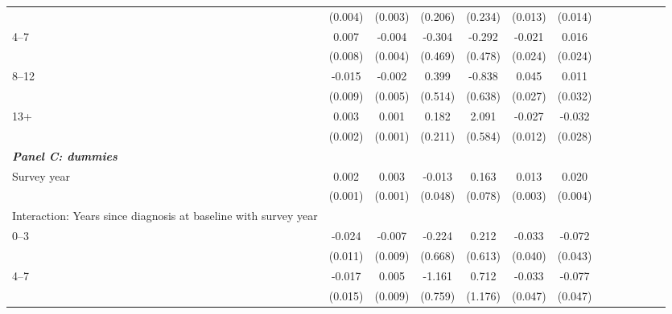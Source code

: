 \documentclass[12pt,english]{article}
\begin{document}
\begin{table}[p]
\begin{center}
\begin{adjustbox}{max width=.9\linewidth}
\begin{threeparttable}
{\begin{tabular}{l*{6}{S S}}
						&  (0.004)         &  (0.003)         &  (0.206)         &  (0.234)         &  (0.013)         &  (0.014)         \\
						\hspace*{10mm}4--7 &    0.007         &   -0.004         &   -0.304         &   -0.292         &   -0.021         &    0.016         \\
						&  (0.008)         &  (0.004)         &  (0.469)         &  (0.478)         &  (0.024)         &  (0.024)         \\
						\hspace*{10mm}8--12 &   -0.015\sym{*}  &   -0.002         &    0.399         &   -0.838         &    0.045\sym{*}  &    0.011         \\
						&  (0.009)         &  (0.005)         &  (0.514)         &  (0.638)         &  (0.027)         &  (0.032)         \\
						\hspace*{10mm}13+ &    0.003         &    0.001         &    0.182         &    2.091\sym{***}&   -0.027\sym{**} &   -0.032         \\
						&  (0.002)         &  (0.001)         &  (0.211)         &  (0.584)         &  (0.012)         &  (0.028)         \\
						\textit{\textbf{Panel C: dummies}} &&&&&&\\
						Survey year     &    0.002\sym{***}&    0.003\sym{***}&   -0.013         &    0.163\sym{**} &    0.013\sym{***}&    0.020\sym{***}\\
						&  (0.001)         &  (0.001)         &  (0.048)         &  (0.078)         &  (0.003)         &  (0.004)         \\
						Interaction: Years since diagnosis at baseline with survey year &&&&&&\\
						\hspace*{10mm}0--3&   -0.024\sym{**} &   -0.007         &   -0.224         &    0.212         &   -0.033         &   -0.072\sym{*}  \\
						&  (0.011)         &  (0.009)         &  (0.668)         &  (0.613)         &  (0.040)         &  (0.043)         \\
						\hspace*{10mm}4--7 &   -0.017         &    0.005         &   -1.161         &    0.712         &   -0.033         &   -0.077         \\
						&  (0.015)         &  (0.009)         &  (0.759)         &  (1.176)         &  (0.047)         &  (0.047)         \\

\end{tabular}}
\end{threeparttable}
\end{adjustbox}
\end{center}
\end{table}
\end{document}
